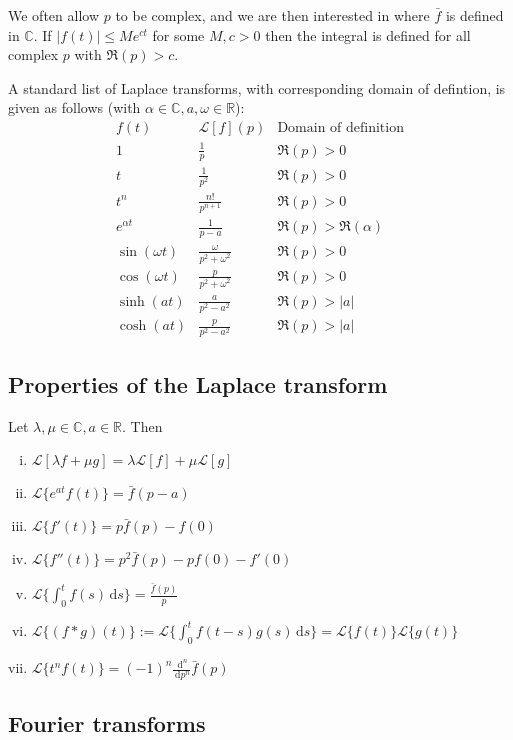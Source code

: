 \documentclass[10pt,fleqn]{article}
\newcommand{\diff}{\,\mathrm{d}}
\newcommand{\comps}{\mathbb{C}}
\newcommand{\reals}{\mathbb{R}}
\theoremstyle{definition} \newtheorem{defn}{Definition}[section]
\theoremstyle{plain}      \newtheorem{thm}[defn]{Theorem}
\theoremstyle{plain}      \newtheorem{lem}[defn]{Lemma}
\theoremstyle{definition} \newtheorem{prop}[defn]{Proposition}
\theoremstyle{definition} \newtheorem{cor}[defn]{Corollary}
\theoremstyle{definition} \newtheorem{ex}[defn]{Example}
\theoremstyle{definition} \newtheorem{rem}[defn]{Remark}
\begin{document}
{We often allow $p$ to be complex, and we are then interested in where $\bar{f}$ is defined in $\comps$. If $|f(t)|\leq Me^{ct}$ for some $M,c>0$ then the integral is defined for all complex $p$ with $\Re(p)>c$.

A standard list of Laplace transforms, with corresponding domain of defintion, is given as follows (with $\alpha\in\comps,a,\omega\in\reals$):
\[
    \begin{array}{ccc}
        f(t) & \mathcal{L}[f](p) & \text{Domain of definition}\\
        1 & \frac{1}{p} & \Re(p)>0\\
        t & \frac{1}{p^2} & \Re(p)>0\\
        t^n & \frac{n!}{p^{n+1}} & \Re(p)>0\\
        e^{\alpha t} & \frac{1}{p-a} & \Re(p)>\Re(\alpha)\\
        \sin(\omega t) & \frac{\omega}{p^2+\omega^2} & \Re(p)>0\\
        \cos(\omega t) & \frac{p}{p^2+\omega^2} & \Re(p)>0\\
        \sinh(at) & \frac{a}{p^2-a^2} & \Re(p)>|a|\\
        \cosh(at) & \frac{p}{p^2-a^2} & \Re(p)>|a|
    \end{array}
\]

\subsection{Properties of the Laplace transform}
Let $\lambda,\mu\in\comps,a\in\reals$.
Then
\begin{enumerate}[(i)]
    \item $\mathcal{L}[\lambda f+\mu g]=\lambda\mathcal{L}[f]+\mu\mathcal{L}[g]$
    \item $\mathcal{L}\{e^{at}f(t)\}=\bar{f}(p-a)$
    \item $\mathcal{L}\{f'(t)\}=p\bar{f}(p)-f(0)$
    \item $\mathcal{L}\{f''(t)\}=p^2\bar{f}(p)-pf(0)-f'(0)$
    \item $\mathcal{L}\{\int_0^tf(s)\diff s\}=\frac{\bar{f}(p)}{p}$
    \item $\mathcal{L}\{(f*g)(t)\}:=\mathcal{L}\{\int_0^t f(t-s)g(s)\diff s\}=\mathcal{L}\{f(t)\}\mathcal{L}\{g(t)\}$
    \item $\mathcal{L}\{t^nf(t)\}=(-1)^n\frac{\diff^n}{\diff p^n}\bar{f}(p)$
\end{enumerate}

\subsection{Fourier transforms}

}
\end{document}
